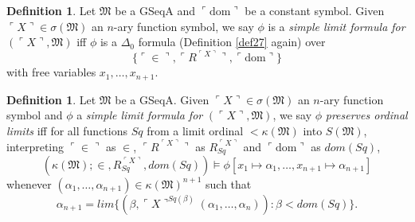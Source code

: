 \documentclass[12pt, twoside]{memoir}
\numberwithin{equation}{section}
\theoremstyle{definition}
\newtheorem{defi}[thm]{Definition}
\theoremstyle{remark}
\theoremstyle{definition}
\theoremstyle{definition}
\theoremstyle{definition}
\theoremstyle{remark}
\begin{document}
\begin{defi}
Let $\mathfrak{M}$ be a GSeqA and $\ulcorner \mathrm{dom} \urcorner$ be a constant symbol. Given $\ulcorner X \urcorner \in \sigma(\mathfrak{M})$ an $n$-ary function symbol, we say $\phi$ is a \emph{simple limit formula for} $(\ulcorner X \urcorner, \mathfrak{M})$ iff $\phi$ is a $\Delta_0$ formula (Definition \ref{def27} again) over $$\{\ulcorner \in \urcorner, \ulcorner R^{\ulcorner X \urcorner} \urcorner, \ulcorner \mathrm{dom} \urcorner\}$$ with free variables $x_1, \dots, x_{n+1}$.
\end{defi}

\begin{defi}\label{def234c}
Let $\mathfrak{M}$ be a GSeqA. Given $\ulcorner X \urcorner \in \sigma(\mathfrak{M})$ an $n$-ary function symbol and $\phi$ a \emph{simple limit formula for} $(\ulcorner X \urcorner, \mathfrak{M})$, we say $\phi$ \emph{preserves ordinal limits} iff for all functions $Sq$ from a limit ordinal $< \kappa(\mathfrak{M})$ into $S(\mathfrak{M})$, interpreting $\ulcorner \in \urcorner$ as $\in$, $\ulcorner R^{\ulcorner X \urcorner} \urcorner$ as $R_{Sq}^{\ulcorner X \urcorner}$ and $\ulcorner \mathrm{dom} \urcorner$ as $dom(Sq)$, 
\begin{equation*}
    (\kappa(\mathfrak{M}); \in, R_{Sq}^{\ulcorner X \urcorner}, dom(Sq)) \models \phi[x_1 \mapsto \alpha_1, \dots, x_{n+1} \mapsto \alpha_{n+1}]
\end{equation*}
whenever $(\alpha_1, \dots, \alpha_{n+1}) \in \kappa(\mathfrak{M})^{n+1}$ such that 
\begin{equation*}
    \alpha_{n+1} = lim \{(\beta, \ulcorner X \urcorner^{Sq(\beta)}(\alpha_1, \dots, \alpha_n)) : \beta < dom(Sq)\} \text{.}
\end{equation*}
\end{defi}
\end{document}

